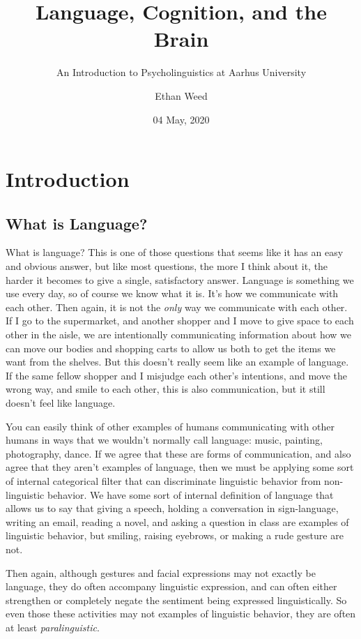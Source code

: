 \documentclass[
]{article}
\title{Language, Cognition, and the Brain}
\subtitle{An Introduction to Psycholinguistics at Aarhus University}
\author{Ethan Weed}
\date{04 May, 2020}
\begin{document}
\maketitle

{
\setcounter{tocdepth}{2}
\tableofcontents
}
\hypertarget{introduction}{%
\section{Introduction}\label{introduction}}

\hypertarget{what-is-language}{%
\subsection{What is Language?}\label{what-is-language}}

What is language? This is one of those questions that seems like it has an easy and obvious answer, but like most questions, the more I think about it, the harder it becomes to give a single, satisfactory answer. Language is something we use every day, so of course we know what it is. It's how we communicate with each other. Then again, it is not the \emph{only} way we communicate with each other. If I go to the supermarket, and another shopper and I move to give space to each other in the aisle, we are intentionally communicating information about how we can move our bodies and shopping carts to allow us both to get the items we want from the shelves. But this doesn't really seem like an example of language. If the same fellow shopper and I misjudge each other's intentions, and move the wrong way, and smile to each other, this is also communication, but it still doesn't feel like language.

You can easily think of other examples of humans communicating with other humans in ways that we wouldn't normally call language: music, painting, photography, dance. If we agree that these are forms of communication, and also agree that they aren't examples of language, then we must be applying some sort of internal categorical filter that can discriminate linguistic behavior from non-linguistic behavior. We have some sort of internal definition of language that allows us to say that giving a speech, holding a conversation in sign-language, writing an email, reading a novel, and asking a question in class are examples of linguistic behavior, but smiling, raising eyebrows, or making a rude gesture are not.

Then again, although gestures and facial expressions may not exactly be language, they do often accompany linguistic expression, and can often either strengthen or completely negate the sentiment being expressed linguistically. So even those these activities may not examples of linguistic behavior, they are often at least \emph{paralinguistic}.
\end{document}
